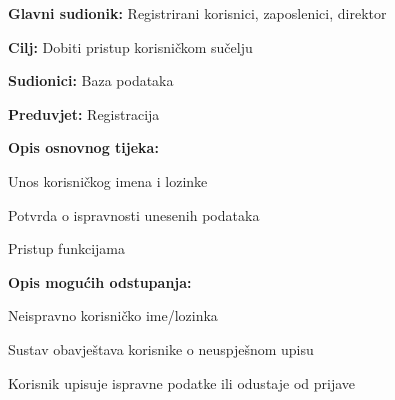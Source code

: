 			
			\noindent{}
			\begin{packed_item}
				
				\item \textbf{Glavni sudionik:} Registrirani korisnici, zaposlenici, direktor
				\item  \textbf{Cilj:} Dobiti pristup korisničkom sučelju
				\item  \textbf{Sudionici:} Baza podataka
				\item  \textbf{Preduvjet:} Registracija
				\item  \textbf{Opis osnovnog tijeka:}
				
				\item[] \begin{packed_enum}
					
					\item Unos korisničkog imena i lozinke
					\item Potvrda o ispravnosti unesenih podataka
					\item Pristup funkcijama
					
				\end{packed_enum}
				
				\item  \textbf{Opis mogućih odstupanja:}
				
				\item[] \begin{packed_item}
					
					\item[2.a] Neispravno korisničko ime/lozinka
					\item[] \begin{packed_enum}
						
						\item Sustav obavještava korisnike o neuspješnom upisu 
						\item Korisnik upisuje ispravne podatke ili odustaje od prijave
					\end{packed_enum}
					
				\end{packed_item}
			\end{packed_item}
			
